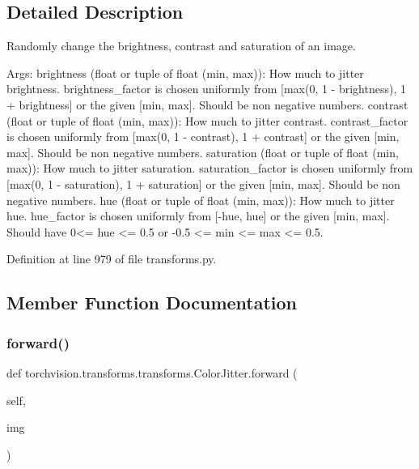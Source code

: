 \subsection{Detailed Description}
\begin{DoxyVerb}Randomly change the brightness, contrast and saturation of an image.

Args:
    brightness (float or tuple of float (min, max)): How much to jitter brightness.
        brightness_factor is chosen uniformly from [max(0, 1 - brightness), 1 + brightness]
        or the given [min, max]. Should be non negative numbers.
    contrast (float or tuple of float (min, max)): How much to jitter contrast.
        contrast_factor is chosen uniformly from [max(0, 1 - contrast), 1 + contrast]
        or the given [min, max]. Should be non negative numbers.
    saturation (float or tuple of float (min, max)): How much to jitter saturation.
        saturation_factor is chosen uniformly from [max(0, 1 - saturation), 1 + saturation]
        or the given [min, max]. Should be non negative numbers.
    hue (float or tuple of float (min, max)): How much to jitter hue.
        hue_factor is chosen uniformly from [-hue, hue] or the given [min, max].
        Should have 0<= hue <= 0.5 or -0.5 <= min <= max <= 0.5.
\end{DoxyVerb}
 

Definition at line 979 of file transforms.\+py.



\subsection{Member Function Documentation}
\mbox{\label{classtorchvision_1_1transforms_1_1transforms_1_1ColorJitter_ad5eeb45fc15659bf39ed9091b43491ac}} 
\subsubsection{\texorpdfstring{forward()}{forward()}}
{\footnotesize\ttfamily def torchvision.\+transforms.\+transforms.\+Color\+Jitter.\+forward (\begin{DoxyParamCaption}\item[{}]{self,  }\item[{}]{img }\end{DoxyParamCaption})}

